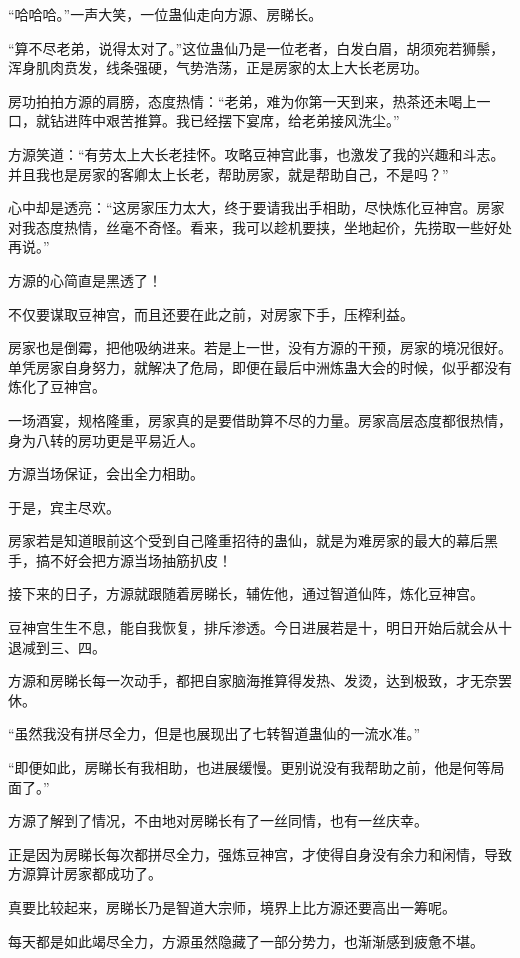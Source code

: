 \begin{this_body}
“哈哈哈。”一声大笑，一位蛊仙走向方源、房睇长。

“算不尽老弟，说得太对了。”这位蛊仙乃是一位老者，白发白眉，胡须宛若狮鬃，浑身肌肉贲发，线条强硬，气势浩荡，正是房家的太上大长老房功。

房功拍拍方源的肩膀，态度热情：“老弟，难为你第一天到来，热茶还未喝上一口，就钻进阵中艰苦推算。我已经摆下宴席，给老弟接风洗尘。”

方源笑道：“有劳太上大长老挂怀。攻略豆神宫此事，也激发了我的兴趣和斗志。并且我也是房家的客卿太上长老，帮助房家，就是帮助自己，不是吗？”

心中却是透亮：“这房家压力太大，终于要请我出手相助，尽快炼化豆神宫。房家对我态度热情，丝毫不奇怪。看来，我可以趁机要挟，坐地起价，先捞取一些好处再说。”

方源的心简直是黑透了！

不仅要谋取豆神宫，而且还要在此之前，对房家下手，压榨利益。

房家也是倒霉，把他吸纳进来。若是上一世，没有方源的干预，房家的境况很好。单凭房家自身努力，就解决了危局，即便在最后中洲炼蛊大会的时候，似乎都没有炼化了豆神宫。

一场酒宴，规格隆重，房家真的是要借助算不尽的力量。房家高层态度都很热情，身为八转的房功更是平易近人。

方源当场保证，会出全力相助。

于是，宾主尽欢。

房家若是知道眼前这个受到自己隆重招待的蛊仙，就是为难房家的最大的幕后黑手，搞不好会把方源当场抽筋扒皮！

接下来的日子，方源就跟随着房睇长，辅佐他，通过智道仙阵，炼化豆神宫。

豆神宫生生不息，能自我恢复，排斥渗透。今日进展若是十，明日开始后就会从十退减到三、四。

方源和房睇长每一次动手，都把自家脑海推算得发热、发烫，达到极致，才无奈罢休。

“虽然我没有拼尽全力，但是也展现出了七转智道蛊仙的一流水准。”

“即便如此，房睇长有我相助，也进展缓慢。更别说没有我帮助之前，他是何等局面了。”

方源了解到了情况，不由地对房睇长有了一丝同情，也有一丝庆幸。

正是因为房睇长每次都拼尽全力，强炼豆神宫，才使得自身没有余力和闲情，导致方源算计房家都成功了。

真要比较起来，房睇长乃是智道大宗师，境界上比方源还要高出一筹呢。

每天都是如此竭尽全力，方源虽然隐藏了一部分势力，也渐渐感到疲惫不堪。


\end{this_body}
